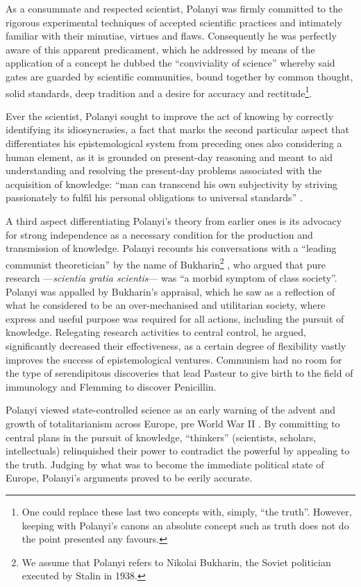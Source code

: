 As a consummate and respected scientist, Polanyi was firmly committed to the rigorous experimental techniques of accepted scientific practices and intimately familiar with their minutiae, virtues and flaws. Consequently he was perfectly aware of this apparent predicament, which he addressed by means of the application of a concept he dubbed the ``conviviality of science'' whereby said gates are guarded by scientific communities, bound together by common thought, solid standards, deep tradition and a desire for accuracy and rectitude\footnote{One could replace these last two concepts with, simply, ``the truth''. However, keeping with Polanyi's canons an absolute concept such as truth does not do the point presented any favours.}. 

Ever the scientist, Polanyi sought to improve the act of knowing by correctly identifying its idiosyncrasies, a fact that marks the second particular aspect that differentiates his epistemological system from preceding ones also considering a human element, as it is grounded on present-day reasoning and meant to aid understanding and resolving the present-day problems associated with the acquisition of knowledge: ``man can transcend his own subjectivity by striving passionately to fulfil his personal obligations to universal standards'' \citep[p.4]{polanyi58}.

A third aspect differentiating Polanyi's theory from earlier ones is its advocacy for strong independence as a necessary condition for the production and transmission of knowledge. Polanyi recounts his conversations with a ``leading communist theoretician'' by the name of Bukharin\footnote{We assume that Polanyi refers to Nikolai Bukharin, the Soviet politician executed by Stalin in 1938.} \citep{polanyi66}, who argued that pure research ---\textit{scientia gratia scientis}--- was ``a morbid symptom of class society''. Polanyi was appalled by Bukharin's appraisal, which he saw as a reflection of what he considered to be an over-mechanised and utilitarian society, where express and useful purpose was required for all actions, including the pursuit of knowledge. Relegating research activities to central control, he argued, significantly decreased their effectiveness, as a certain degree of flexibility vastly improves the success of epistemological ventures. Communism had no room for the type of serendipitous discoveries that lead Pasteur to give birth to the field of immunology and Flemming to discover Penicillin.

Polanyi viewed state-controlled science as an early warning of the advent and growth of totalitarianism across Europe, pre World War II \citep{polanyi36}. By committing to central plans in the pursuit of knowledge, ``thinkers'' (scientists, scholars, intellectuals) relinquished their power to contradict the powerful by appealing to the truth. Judging by what was to become the immediate political state of Europe, Polanyi's arguments proved to be eerily accurate.

